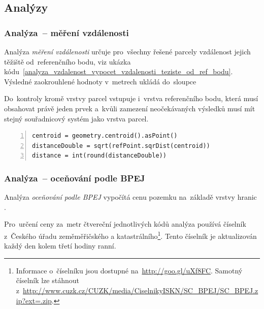 \subsection{Analýzy}
\label{analyzy}

\subsubsection{Analýza~– měření vzdálenosti}
\label{analyza_vzdalenosti}

Analýza \textit{měření vzdálenosti} určuje pro~všechny řešené parcely
vzdálenost jejich těžiště od~referenčního bodu, viz ukázka
kódu~\ref{analyza_vzdalenost_vypocet_vzdalenosti_teziste_od_ref_bodu}. Výsledné
zaokrouhlené hodnoty v~metrech ukládá do~sloupce
\texttt{}

Do~kontroly kromě vrstvy parcel vstupuje i~vrstva referenčního bodu,
která musí obsahovat právě jeden prvek a~kvůli zamezení neočekávaných
výsledků musí mít stejný souřadnicový systém jako vrstva parcel.

{\scriptsize
\begin{lstlisting}[style=python, caption={Analýza \textit{měření
vzdálenosti}~– výpočet vzdálenosti těžiště\newline od~referenčního
bodu}, captionpos=b,
label=analyza_vzdalenost_vypocet_vzdalenosti_teziste_od_ref_bodu,
backgroundcolor = \color{light-gray}, numbers=left]
centroid = geometry.centroid().asPoint()
distanceDouble = sqrt(refPoint.sqrDist(centroid))
distance = int(round(distanceDouble))
\end{lstlisting}}

\subsubsection{Analýza~– oceňování podle BPEJ}
\label{analyza_bpej}

Analýza \textit{oceňování podle BPEJ} vypočítá cenu pozemku na~základě
vrstvy hranic .

Pro~určení ceny za~metr čtvereční jednotlivých kódů  analýza
používá číselník  z~Českého úřadu zeměměřičského a
katastrálního\footnote{Informace o~číselníku jsou dostupné
na~\url{http://goo.gl/uXf8FC}. Samotný číselník lze stáhnout
z~\url{http://www.cuzk.cz/CUZK/media/CiselnikyISKN/SC_BPEJ/SC_BPEJ.zip?ext=.zip}.}. Tento
číselník je aktualizován každý den kolem třetí hodiny ranní.


